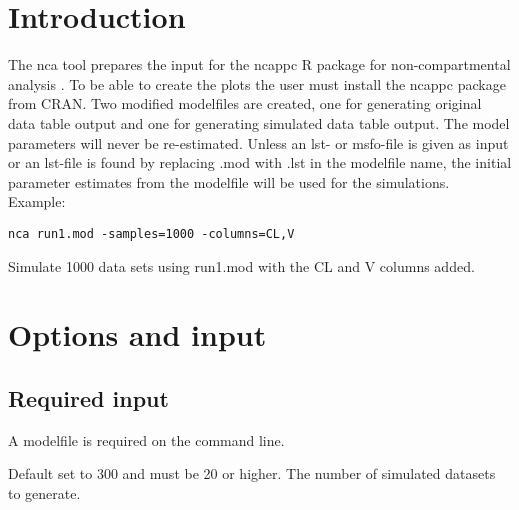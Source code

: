
\usepackage{hyperref}
\newcommand{\guidetoolname}{nca}



\maketitle
\tableofcontents
\newpage

\section{Introduction}
The nca tool prepares the input for the ncappc R package for non-compartmental analysis \cite{Chayan}. To be able to create the plots the user must install the ncappc package from CRAN. Two modified modelfiles are created, one for generating original data table output and one for generating simulated data table output. The model parameters will never be re-estimated. Unless an lst- or msfo-file is given as input or an lst-file is found by replacing .mod with .lst in the modelfile name, the initial parameter estimates from the modelfile will be used for the simulations.\\
Example:
\begin{verbatim}
nca run1.mod -samples=1000 -columns=CL,V
\end{verbatim}
Simulate 1000 data sets using run1.mod with the CL and V columns added.

\section{Options and input}

\subsection{Required input}
A modelfile is required on the command line.
\begin{optionlist}
Default set to 300 and must be 20 or higher. The number of simulated datasets to generate. 
\nextopt
\end{optionlist}

